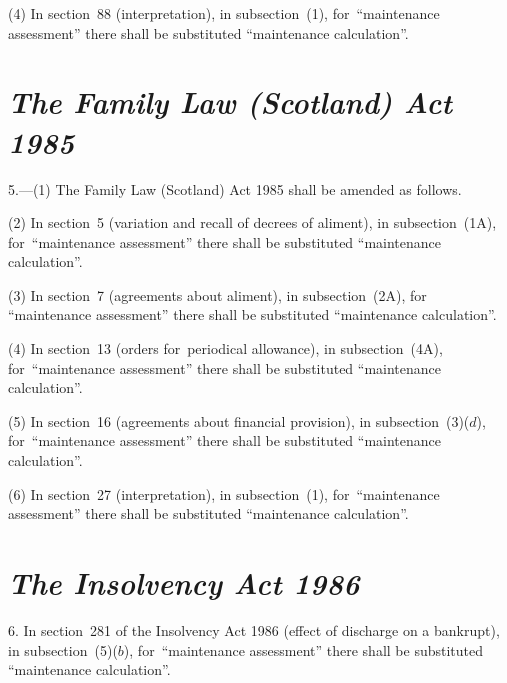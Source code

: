 \documentclass[12pt,a4paper]{article}
\begin{document}
(4) In section~88 (interpretation), in subsection~(1), for~“maintenance assessment” there shall be substituted “maintenance calculation”.


\section*{\itshape The Family Law (Scotland) Act 1985}

5.---(1) The Family Law (Scotland) Act 1985 shall be amended as follows.

(2) In section~5 (variation and recall of decrees of aliment), in subsection~(1A), for~“maintenance assessment” there shall be substituted “maintenance calculation”.

(3) In section~7 (agreements about aliment), in subsection~(2A), for “maintenance assessment” there shall be substituted “maintenance calculation”.

(4) In section~13 (orders for~periodical allowance), in subsection~(4A), for~“maintenance assessment” there shall be substituted “maintenance calculation”.

\begin{sloppypar}
(5) In section~16 (agreements about financial provision), in subsection~(3)($d$), for~“maintenance assessment” there shall be substituted “maintenance calculation”.
\end{sloppypar}

(6) In section~27 (interpretation), in subsection~(1), for~“maintenance assessment” there shall be substituted “maintenance calculation”.


\section*{\itshape The Insolvency Act 1986}

6. In section~281 of the Insolvency Act 1986 (effect of discharge on a bankrupt), in subsection~(5)($b$), for~“maintenance assessment” there shall be substituted “maintenance calculation”.

\end{document}
